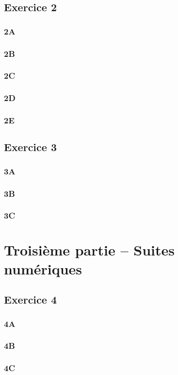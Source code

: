 \documentclass[a4paper,14pt]{extarticle} %
\begin{document}
\subsection{Exercice 2}


\subsubsection{2A}


\subsubsection{2B}


\subsubsection{2C}


\subsubsection{2D}


\subsubsection{2E}





\subsection{Exercice 3}

\subsubsection{3A}


\subsubsection{3B}


\subsubsection{3C}







\section{Troisième partie – Suites numériques}

\subsection{Exercice 4}


\subsubsection{4A}


\subsubsection{4B}


\subsubsection{4C}
\end{document}
